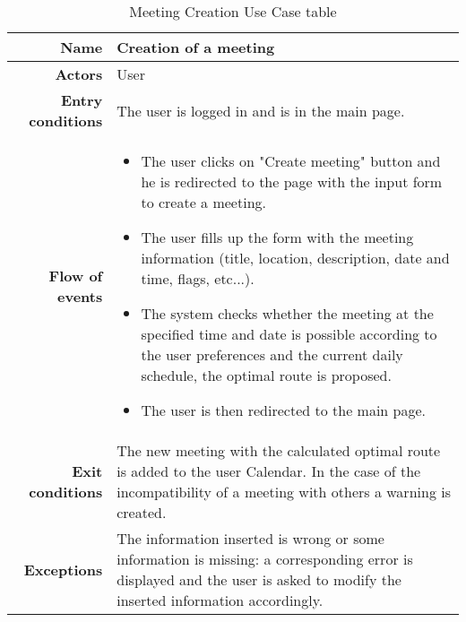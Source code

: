 \begin{table}[htp]

\begin{tabular}{r|p{7cm}}
\bf\large Name&\bf\large Creation of a meeting\\
\hline
\hline
\bf Actors&User\\
\hline
\bf Entry conditions&The user is logged in and is in the main page.\\
\hline
\bf Flow of events&
\begin{itemize}

\item The user clicks on "Create meeting" button and he is redirected to the page with the input form to create a meeting.

\item The user fills up the form with the meeting information (title, location, description, date and time, flags, etc...).

\item The system checks whether the meeting at the specified time and date is possible according to the user preferences and the current daily schedule, the optimal route is proposed.


\item The user is then redirected to the main page.

\end{itemize}
\\
\hline
\bf Exit conditions&The new meeting with the calculated optimal route is added to the user Calendar. In the case of the incompatibility of a meeting with others a warning is created.\\
\hline
\bf Exceptions&The information inserted is wrong or some information is missing: a corresponding error is displayed and the user is asked to modify the inserted information accordingly.
\\
\hline

\end{tabular}
\caption{Meeting Creation Use Case table}
 \label{tab:meetingcreationtab}
\end{table}
